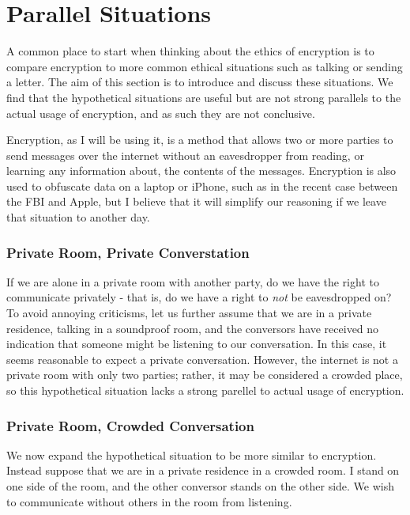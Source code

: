 \documentclass[11pt]{article}
\begin{document}
\section{Parallel Situations}
A common place to start when thinking about the ethics of encryption is to compare encryption to more common ethical situations such as talking or sending a letter.
The aim of this section is to introduce and discuss these situations.
We find that the hypothetical situations are useful but are not strong parallels to the actual usage of encryption, and as such they are not conclusive.

Encryption, as I will be using it, is a method that allows two or more parties to send messages over the internet without an eavesdropper from reading, or learning any information about, the contents of the messages.
Encryption is also used to obfuscate data on a laptop or iPhone, such as in the recent case between the FBI and Apple, but I believe that it will simplify our reasoning if we leave that situation to another day.

\subsubsection{Private Room, Private Converstation}
If we are alone in a private room with another party, do we have the right to communicate privately - that is, do we have a right to \textit{not} be eavesdropped on?
To avoid annoying criticisms, let us further assume that we are in a private residence, talking in a soundproof room, and the conversors have received no indication that someone might be listening to our conversation.
In this case, it seems reasonable to expect a private conversation.
However, the internet is not a private room with only two parties; rather, it may be considered a crowded place, so this hypothetical situation lacks a strong parellel to actual usage of encryption.


\subsubsection{Private Room, Crowded Conversation}

We now expand the hypothetical situation to be more similar to encryption.
Instead suppose that we are in a private residence in a crowded room. 
I stand on one side of the room, and the other conversor stands on the other side.
We wish to communicate without others in the room from listening.
\end{document}
